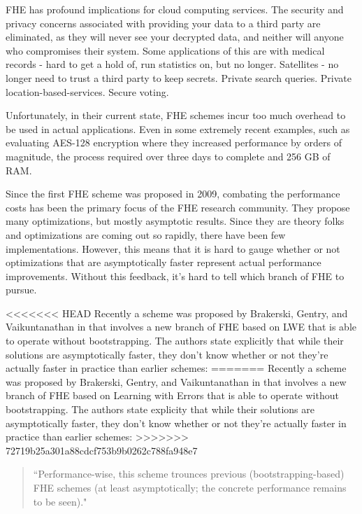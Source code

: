 \documentclass[letterpaper,twocolumn,10pt]{article}
\begin{document}
FHE has profound implications for cloud computing services. The security and privacy concerns associated with providing your data to a third party are eliminated, as they will never see your decrypted data, and neither will anyone who compromises their system. Some applications of this are with medical records - hard to get a hold of, run statistics on, but no longer. Satellites - no longer need to trust a third party to keep secrets. Private search queries. Private location-based-services. Secure voting.

Unfortunately, in their current state, FHE schemes incur too much overhead to be used in actual applications. Even in some extremely recent examples, such as evaluating AES-128 encryption where they increased performance by orders of magnitude, the process required over three days to complete and 256 GB of RAM\cite{AES}. 

Since the first FHE scheme was proposed in 2009, combating the performance costs has been the primary focus of the FHE research community. They propose many optimizations, but mostly asymptotic results. Since they are theory folks and optimizations are coming out so rapidly, there have been few implementations. However, this means that it is hard to gauge whether or not optimizations that are asymptotically faster represent actual performance improvements. Without this feedback, it's hard to tell which branch of FHE to pursue.

<<<<<<< HEAD
Recently a scheme was proposed by Brakerski, Gentry, and Vaikuntanathan in \cite{SansBootstrapping} that involves a new branch of FHE based on LWE that is able to operate without bootstrapping. The authors state explicitly that while their solutions are asymptotically faster, they don't know whether or not they're actually faster in practice than earlier schemes:
=======
Recently a scheme was proposed by Brakerski, Gentry, and Vaikuntanathan in \cite{SansBootstrapping} that involves a new branch of FHE based on Learning with Errors that is able to operate without bootstrapping. The authors state explicity that while their solutions are asymptotically faster, they don't know whether or not they're actually faster in practice than earlier schemes:
>>>>>>> 72719b25a301a88cdcf753b9b0262c788fa948e7

\begin{quotation}
``Performance-wise, this scheme trounces previous (bootstrapping-based) FHE schemes (at least asymptotically; the concrete performance remains to be seen)."
\end{quotation}
\end{document}
